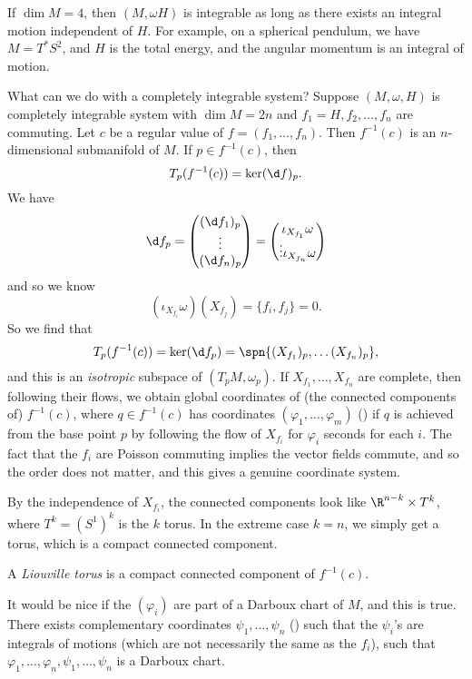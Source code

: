 \documentclass[a4paper]{article}
\begin{document}
\begin{eg}
  If $\dim M = 4$, then $(M, \omega H)$ is integrable as long as there exists an integral motion independent of $H$. For example, on a spherical pendulum, we have $M = T^* S^2$, and $H$ is the total energy, and the angular momentum is an integral of motion.
\end{eg}
What can we do with a completely integrable system? Suppose $(M, \omega, H)$ is completely integrable system with $\dim M = 2n$ and $f_1 = H, f_2, \ldots, f_n$ are commuting. Let $c$ be a regular value of $f = (f_1, \ldots, f_n)$. Then $f^{-1}(c)$ is an $n$-dimensional submanifold of $M$. If $p \in f^{-1}(c)$, then
\[
  T_p(f^{-1}(c)) = \ker (\d f)_p.
\]
We have
\[
  \d f_p = 
  \begin{pmatrix}
    (\d f_1)_p\\
    \vdots\\
    (\d f_n)_p
  \end{pmatrix}
  =
  \begin{pmatrix}
    \iota_{X_{f_1}} \omega\\\vdots \iota_{X_{f_n}}\omega
  \end{pmatrix}
\]
and so we know 
\[
  (\iota_{X_{f_i}} \omega) (X_{f_j}) = \{f_i, f_j\} = 0.
\]
So we find that
\[
  T_p (f^{-1}(c)) = \ker (\d f_p) = \spn \{(X_{f_1})_p, \ldots (X_{f_n})_p\},
\]
and this is an \emph{isotropic} subspace of $(T_p M, \omega_p)$. If $X_{f_1}, \ldots, X_{f_n}$ are complete, then following their flows, we obtain global coordinates of (the connected components of) $f^{-1}(c)$, where $q \in f^{-1}(c)$ has coordinates $(\varphi_1, \ldots, \varphi_m)$ () if $q$ is achieved from the base point $p$ by following the flow of $X_{f_i}$ for $\varphi_i$ seconds for each $i$. The fact that the $f_i$ are Poisson commuting implies the vector fields commute, and so the order does not matter, and this gives a genuine coordinate system.

By the independence of $X_{f_i}$, the connected components look like $\R^{n - k} \times T^k$, where $T^k = (S^1)^k$ is the $k$ torus. In the extreme case $k = n$, we simply get a torus, which is a compact connected component.

\begin{defi}
  A \emph{Liouville torus} is a compact connected component of $f^{-1}(c)$.
\end{defi}

It would be nice if the $(\varphi_i)$ are part of a Darboux chart of $M$, and this is true. There exists complementary coordinates $\psi_1, \ldots, \psi_n$ () such that the $\psi_i$'s are integrals of motions (which are not necessarily the same as the $f_i$), such that $\varphi_1, \ldots, \varphi_n, \psi_1, \ldots, \psi_n$ is a Darboux chart.
\end{document}
